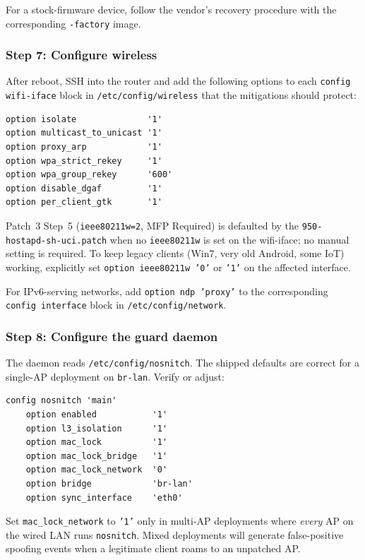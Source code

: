 \noindent For a stock-firmware device, follow the vendor's recovery
procedure with the corresponding \texttt{-factory} image.

\subsubsection{Step 7: Configure wireless}

After reboot, SSH into the router and add the following options to each
\texttt{config wifi-iface} block in \texttt{/etc/config/wireless} that
the mitigations should protect:

\begin{lstlisting}
option isolate              '1'
option multicast_to_unicast '1'
option proxy_arp            '1'
option wpa_strict_rekey     '1'
option wpa_group_rekey      '600'
option disable_dgaf         '1'
option per_client_gtk       '1'
\end{lstlisting}

\noindent Patch~3 Step~5 (\texttt{ieee80211w=2}, MFP Required) is
defaulted by the \texttt{950-hostapd-sh-uci.patch} when no
\texttt{ieee80211w} is set on the wifi-iface; no manual setting is
required. To keep legacy clients (Win7, very old Android, some IoT)
working, explicitly set \texttt{option ieee80211w '0'} or \texttt{'1'}
on the affected interface.

For IPv6-serving networks, add \texttt{option ndp 'proxy'} to the
corresponding \texttt{config interface} block in
\texttt{/etc/config/network}.

\subsubsection{Step 8: Configure the guard daemon}

The daemon reads \texttt{/etc/config/nosnitch}. The shipped defaults are
correct for a single-AP deployment on \texttt{br-lan}. Verify or adjust:

\begin{lstlisting}
config nosnitch 'main'
    option enabled           '1'
    option l3_isolation      '1'
    option mac_lock          '1'
    option mac_lock_bridge   '1'
    option mac_lock_network  '0'
    option bridge            'br-lan'
    option sync_interface    'eth0'
\end{lstlisting}

\noindent Set \texttt{mac\_lock\_network} to \texttt{'1'} only in
multi-AP deployments where \emph{every} AP on the wired LAN runs
\texttt{nosnitch}. Mixed deployments will generate false-positive
spoofing events when a legitimate client roams to an unpatched AP.

